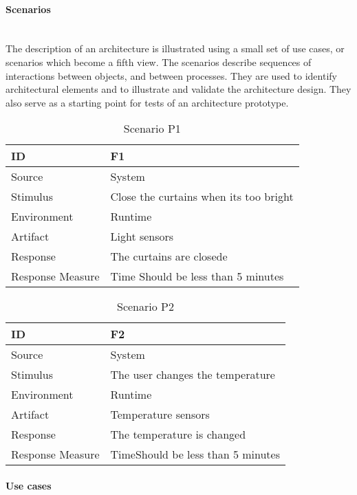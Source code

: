 \documentclass[../document]{subfiles}
\begin{document}
\paragraph{Scenarios} \ \\
The description of an architecture is illustrated using a small set of use cases, or scenarios which become a fifth view. The scenarios describe sequences of interactions between objects, and between processes. They are used to identify architectural elements and to illustrate and validate the architecture design. They also serve as a starting point for tests of an architecture prototype.

\begin{table}[H]
	\caption{Scenario P1}
	\begin{tabularx}{\textwidth}{|X|X|}
		\hline
		ID					& F1 \\ \hline
		Source				& System \\ \hline
		Stimulus			& Close the curtains when its too bright \\ \hline
		Environment			& Runtime \\ \hline
		Artifact			& Light sensors \\ \hline
		Response			& The curtains are closede \\ \hline
		Response Measure	& Time \newline Should be less than 5 minutes
		\\ \hline
	\end{tabularx}
\end{table}

\begin{table}[H]
	\caption{Scenario P2}
	\begin{tabularx}{\textwidth}{|X|X|}
		\hline
		ID					& F2 \\ \hline
		Source				& System \\ \hline
		Stimulus			& The user changes the temperature \\ \hline
		Environment			& Runtime \\ \hline
		Artifact			& Temperature sensors \\ \hline
		Response			& The temperature is changed \\ \hline
		Response Measure	& Time\newline Should be less than 5 minutes
		\\ \hline
	\end{tabularx}
\end{table}


\paragraph{Use cases} \ \\
\end{document}
